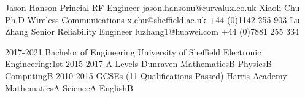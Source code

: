 \documentclass[9pt]{developercv} %
\begin{document}
\begin{minipage}[t]{0.40\textwidth}%

	\halfentry
		{Jason Hanson}
		{Princial RF Engineer}
		{
			\hspace*{0.5cm}jason.hansonu@curvalux.co.uk\newline
		}
	\halfentry
		{Xiaoli Chu}
		{Ph.D Wireless Communications}
		{
			\hspace*{0.5cm}x.chu@sheffield.ac.uk\newline
			\hspace*{0.5cm}+44 (0)1142 255 903\newline
		}
	\halfentry
		{Lu Zhang}
		{Senior Reliability Engineer}
		{	
			\hspace*{0.5cm}luzhang1@huawei.com\newline
			\hspace*{0.5cm}+44 (0)7881 255 334\newline
		}

	
\end{minipage}
\hspace*{0.5cm}
\begin{minipage}[t]{0.57\textwidth}

	\halfentrydate
		{2017-2021}
		{Bachelor of Engineering}
		{University of Sheffield}
		{
			\hspace*{0.5cm}Electronic Engineering:\hfill1st\newline
		}
	\halfentrydate
		{2015-2017}
		{A-Levels}
		{Dunraven}
		{
			\hspace*{0.5cm}Mathematics\hfill B\newline
			\hspace*{0.5cm}Physics\hfill B\newline
			\hspace*{0.5cm}Computing\hfill B\newline
		}
	\halfentrydate
		{2010-2015}
		{GCSEs (11 Qualifications Passed)}
		{Harris Academy}
		{
			\hspace*{0.5cm}Mathematics\hfill A\newline
			\hspace*{0.5cm}Science\hfill A\newline
			\hspace*{0.5cm}English\hfill B\newline
		}
\end{minipage}%
\end{document}
